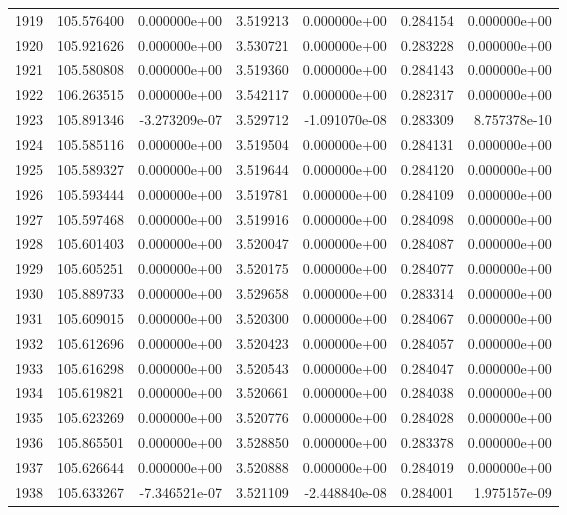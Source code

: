 \begin{tabular}{rrrrrrr}
1919 & 105.576400 &  0.000000e+00 &  3.519213 &  0.000000e+00 &    0.284154 &  0.000000e+00 \\
1920 & 105.921626 &  0.000000e+00 &  3.530721 &  0.000000e+00 &    0.283228 &  0.000000e+00 \\
1921 & 105.580808 &  0.000000e+00 &  3.519360 &  0.000000e+00 &    0.284143 &  0.000000e+00 \\
1922 & 106.263515 &  0.000000e+00 &  3.542117 &  0.000000e+00 &    0.282317 &  0.000000e+00 \\
1923 & 105.891346 & -3.273209e-07 &  3.529712 & -1.091070e-08 &    0.283309 &  8.757378e-10 \\
1924 & 105.585116 &  0.000000e+00 &  3.519504 &  0.000000e+00 &    0.284131 &  0.000000e+00 \\
1925 & 105.589327 &  0.000000e+00 &  3.519644 &  0.000000e+00 &    0.284120 &  0.000000e+00 \\
1926 & 105.593444 &  0.000000e+00 &  3.519781 &  0.000000e+00 &    0.284109 &  0.000000e+00 \\
1927 & 105.597468 &  0.000000e+00 &  3.519916 &  0.000000e+00 &    0.284098 &  0.000000e+00 \\
1928 & 105.601403 &  0.000000e+00 &  3.520047 &  0.000000e+00 &    0.284087 &  0.000000e+00 \\
1929 & 105.605251 &  0.000000e+00 &  3.520175 &  0.000000e+00 &    0.284077 &  0.000000e+00 \\
1930 & 105.889733 &  0.000000e+00 &  3.529658 &  0.000000e+00 &    0.283314 &  0.000000e+00 \\
1931 & 105.609015 &  0.000000e+00 &  3.520300 &  0.000000e+00 &    0.284067 &  0.000000e+00 \\
1932 & 105.612696 &  0.000000e+00 &  3.520423 &  0.000000e+00 &    0.284057 &  0.000000e+00 \\
1933 & 105.616298 &  0.000000e+00 &  3.520543 &  0.000000e+00 &    0.284047 &  0.000000e+00 \\
1934 & 105.619821 &  0.000000e+00 &  3.520661 &  0.000000e+00 &    0.284038 &  0.000000e+00 \\
1935 & 105.623269 &  0.000000e+00 &  3.520776 &  0.000000e+00 &    0.284028 &  0.000000e+00 \\
1936 & 105.865501 &  0.000000e+00 &  3.528850 &  0.000000e+00 &    0.283378 &  0.000000e+00 \\
1937 & 105.626644 &  0.000000e+00 &  3.520888 &  0.000000e+00 &    0.284019 &  0.000000e+00 \\
1938 & 105.633267 & -7.346521e-07 &  3.521109 & -2.448840e-08 &    0.284001 &  1.975157e-09 \\

\end{tabular}
